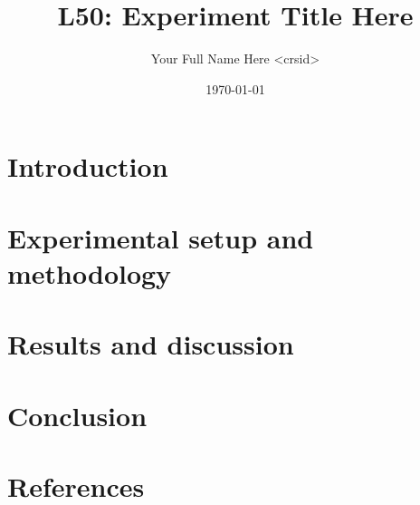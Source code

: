 \documentclass[a4paper,10pt]{article}
\begin{document}
\title{L50: Experiment Title Here}
\author{Your Full Name Here \textless{}crsid\textgreater{}}
\date{\today}

\maketitle

\thispagestyle{empty}

\begin{abstract}
\end{abstract}

\clearpage

\setcounter{page}{1}

\section{Introduction}

\section{Experimental setup and methodology}

\section{Results and discussion}

\section{Conclusion}

\section{References}

\end{document}
